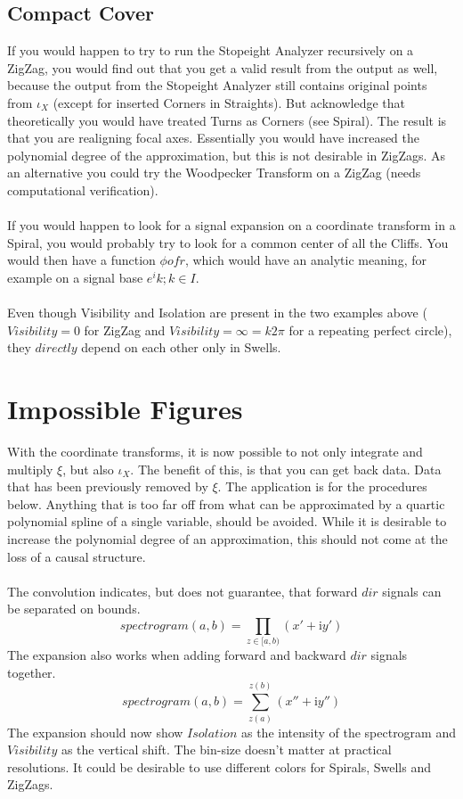\documentclass{report}
\begin{document}
\subsection*{Compact Cover}

If you would happen to try to run the Stopeight Analyzer recursively on a ZigZag, you would find out that you get a valid result from the output as well, because the output from the Stopeight Analyzer still contains original points from $\iota_{X}$ (except for inserted Corners in Straights). But acknowledge that theoretically you would have treated Turns as Corners (see Spiral). The result is that you are realigning focal axes. Essentially you would have increased the polynomial degree of the approximation, but this is not desirable in ZigZags. As an alternative you could try the Woodpecker Transform on a ZigZag (needs computational verification).\\\\
If you would happen to look for a signal expansion on a coordinate transform in a Spiral, you would probably try to look for a common center of all the Cliffs. You would then have a function $\phi of r$, which would have an analytic meaning, for example on a signal base $e^ik;k \in I$.\\\\
Even though Visibility and Isolation are present in the two examples above ($Visibility=0$ for ZigZag and $Visibility=\infty=k2\pi$ for a repeating perfect circle), they $directly$ depend on each other only in Swells.

\section{Impossible Figures}

With the coordinate transforms, it is now possible to not only integrate and multiply $\xi$, but also $\iota_{X}$. The benefit of this, is that you can get back data. Data that has been previously removed by $\xi$. The application is for the procedures below. Anything that is too far off from what can be approximated by a quartic polynomial spline of a single variable, should be avoided. While it is desirable to increase the polynomial degree of an approximation, this should not come at the loss of a causal structure.\\\\
The convolution indicates, but does not guarantee, that forward $dir$ signals can be separated on bounds.
\begin{equation}
spectrogram(a,b)=\prod \limits _{z \in [a,b)} (x'+\mathrm{i}y')
\end{equation}
The expansion also works when adding forward and backward $dir$ signals together.
\begin{equation}
spectrogram(a,b)=\sum \limits _{z(a)}^{z(b)} (x''+\mathrm{i}y'')
\end{equation}
The expansion should now show $Isolation$ as the intensity of the spectrogram and $Visibility$ as the vertical shift. The bin-size doesn't matter at practical resolutions. It could be desirable to use different colors for Spirals, Swells and ZigZags.
\end{document}
